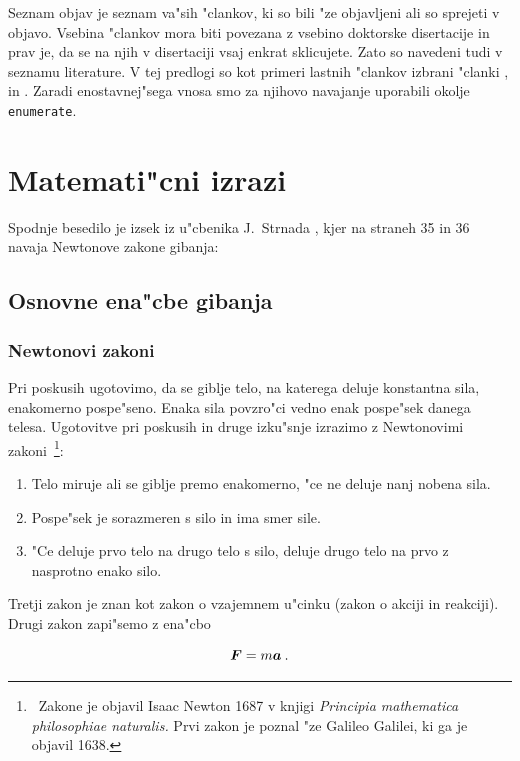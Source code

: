 
Seznam objav je seznam va"sih "clankov, ki so bili "ze objavljeni ali so sprejeti v objavo. 
Vsebina "clankov mora biti povezana z vsebino doktorske disertacije in prav je, da se na njih v disertaciji vsaj enkrat sklicujete. 
Zato so navedeni tudi v seznamu literature. V tej predlogi so kot primeri lastnih "clankov izbrani "clanki \cite{Multiple}, \cite{Variation} in \cite{Diffusion}. 
Zaradi enostavnej"sega vnosa smo za njihovo navajanje uporabili okolje {\tt enumerate}.


%
\chapter{Matemati"cni izrazi}
\label{chMa}

Spodnje besedilo je izsek iz u"cbenika J.~Strnada \cite{St}, kjer na straneh 35 in 36 navaja Newtonove zakone gibanja:

\section{Osnovne ena"cbe gibanja}
\subsection{Newtonovi zakoni}

Pri poskusih ugotovimo, da se giblje telo, na katerega deluje 
konstantna sila, enakomerno pospe"seno. Enaka sila povzro"ci 
vedno enak pospe"sek danega telesa.  Ugotovitve pri poskusih 
in druge izku"snje izrazimo z Newtonovimi zakoni~\footnote{~Zakone 
je objavil Isaac Newton 1687 v knjigi {\it Principia mathematica 
philosophiae naturalis.}  Prvi zakon je poznal "ze Galileo Galilei, 
ki ga je objavil 1638.}:

\begin{enumerate}
\item{Telo miruje ali se giblje premo enakomerno, "ce ne deluje nanj nobena sila.}
\item{Pospe"sek je sorazmeren s silo in ima smer sile.}
\item{"Ce deluje prvo telo na drugo telo s silo, deluje drugo telo na prvo z nasprotno enako silo.}
\end{enumerate}

Tretji zakon je znan kot zakon o vzajemnem u"cinku (zakon o akciji in reakciji). 
Drugi zakon zapi"semo z ena"cbo

\begin{equation}
{\hbox{\boldmath{$F$}}} = m {\hbox{\boldmath{$a$}}} \> .
\label{1NZ}
\end{equation}

